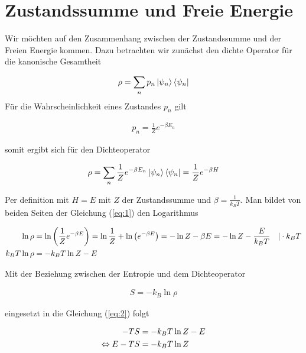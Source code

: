 
\usepackage{amsmath} 





\section*{Zustandssumme und Freie Energie}

Wir möchten auf den Zusammenhang zwischen der Zustandssumme und der Freien Energie kommen. Dazu betrachten wir zunächst den dichte Operator für die kanonische Gesamtheit


\begin{align}
  \label{eq:7}
  \rho = \sum_n p_n \left| \psi_n \right\rangle\left\langle \psi_n \right|
\end{align}
Für die Wahrscheinlichkeit eines Zustandes \(p_n\) gilt

\begin{align}
  \label{eq:8}
  p_n = \frac{1}{Z}e^{-\beta E_n}
\end{align}

somit ergibt sich für den Dichteoperator

\begin{align}
  \label{eq:1}
  \rho = \sum_n \frac{1}{Z}e^{-\beta E_n} \left| \psi_n \right\rangle\left\langle \psi_n \right| = \frac{1}{Z}e^{-\beta H}
\end{align}

Per definition mit \(H=E\) mit \(Z\) der Zustandssumme und \(\beta=\frac{1}{k_B T}\). Man bildet von beiden Seiten der Gleichung (\ref{eq:1}) den Logarithmus

\begin{align}
  \label{eq:2}
  \ln \rho &= \ln\left( \frac{1}{Z}e^{-\beta E} \right) = \ln\frac{1}{Z} + \ln\left( e^{-\beta E}\right) = - \ln Z -\beta E =  - \ln Z - \frac{E}{k_B T} \quad | \cdot k_B T \notag \\
k_B T \ln \rho &=   - k_B T \ln Z - E
\end{align}

Mit der Beziehung zwischen der Entropie und dem Dichteoperator

\begin{align}
  \label{eq:3}
  S = -k_B \ln\rho
\end{align}

eingesetzt in die Gleichung (\ref{eq:2}) folgt

\begin{align}
  \label{eq:4}
  -TS &=  - k_B T \ln Z - E \notag \\
\Leftrightarrow E - TS &=  - k_B T \ln Z
\end{align}

